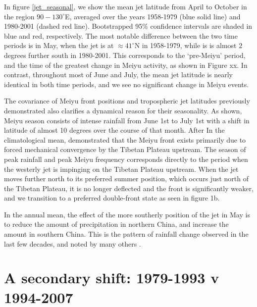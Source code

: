 \documentclass[draft,grl]{AGUTeX}
\begin{document}
\begin{article}
In figure \ref{jet_seasonal}, we show the mean jet latitude from April to October in the region $90-130^\circ$E, averaged over the years 1958-1979 (blue solid line) and 1980-2001 (dashed red line). Bootstrapped 95\% confidence intervals are shaded in blue and red, respectively. The most notable difference between the two time periods is in May, when the jet is at $\approx 41^\circ$N in 1958-1979, while is is almost $2$ degrees further south in 1980-2001. This corresponds to the `pre-Meiyu' period, and the time of the greatest change in Meiyu activity, as shown in Figure xx. In contrast, throughout most of June and July, the mean jet latitude is nearly identical in both time periods, and we see no significant change in Meiyu events. 

	The covariance of Meiyu front positions and tropospheric jet latitudes previously demonstrated also clarifies a dynamical reason for their seasonality. As shown, Meiyu season consists of intense rainfall from June 1st to July 1st with a shift in latitude of almost 10 degrees over the course of that month. After  In the climatological mean, \cite{Chen2014} demonstrated that the Meiyu front exists primarily due to forced mechanical convergence by the Tibetan Plateau upstream. The season of peak rainfall and peak Meiyu frequency corresponds directly to the period when the westerly jet is impinging on the Tibetan Plateau upstream. When the jet moves further north to its preferred summer position, which occurs just north of the Tibetan Plateau, it is no longer deflected and the front is significantly weaker, and we transition to a preferred double-front state as seen in figure 1b. 

In the annual mean, the effect of the more southerly position of the jet in May is to reduce the amount of precipitation in northern China, and increase the amount in southern China. This is the pattern of rainfall change observed in the last few decades, and noted by many others \citep[.e.g.][]{Hu1997,Gong2002}. 
	
\section{A secondary shift: 1979-1993 v 1994-2007}
	

\end{article}
\end{document}
